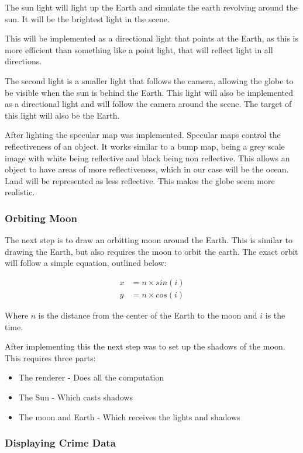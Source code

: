 \documentclass[]{article}
\begin{document}
The sun light will light up the Earth and simulate the earth revolving around the sun.
It will be the brightest light in the scene.

This will be implemented as a directional light that points at the Earth,
as this is more efficient than something like a point light, that will reflect light in all directions.

The second light is a smaller light that follows the camera,
allowing the globe to be visible when the sun is behind the Earth.
This light will also be implemented as a directional light and will follow the camera around the scene.
The target of this light will also be the Earth.

After lighting the specular map was implemented.
Specular maps control the reflectiveness of an object.
It works similar to a bump map, being a grey scale image with white being reflective
and black being non reflective.
This allows an object to have areas of more reflectiveness,
which in our case will be the ocean.
Land will be represented as less reflective.
This makes the globe seem more realistic.

\subsubsection{Orbiting Moon}

The next step is to draw an orbitting moon around the Earth.
This is similar to drawing the Earth, but also requires the moon to orbit the earth.
The exact orbit will follow a simple equation, outlined below:

\begin{align*}
    x &= n \times sin(i)\\
    y &= n \times cos(i)
\end{align*}

Where $n$ is the distance from the center of the Earth to the moon and $i$ is the time.

After implementing this the next step was to set up the shadows of the moon.
This requires three parts:

\begin{itemize}
    \item The renderer - Does all the computation
    \item The Sun - Which casts shadows
    \item The moon and Earth - Which receives the lights and shadows
\end{itemize}

\subsubsection{Displaying Crime Data}
\end{document}
